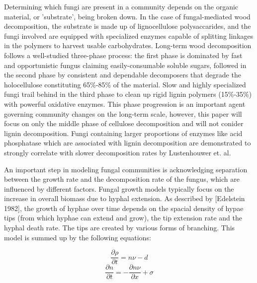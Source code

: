 \documentclass[12pt]{article}
\begin{document}
\begin{multicols}{2}
Determining which fungi are present in a community depends on the organic material, or 'substrate', being broken down. In the case of fungal-mediated wood decomposition, the substrate is made up of lignocellulose polysaccarides, and the fungi involved are equipped with specialized enzymes capable of splitting linkages in the polymers to harvest usable carbohydrates. Long-term wood decomposition follows a well-studied three-phase process: the first phase is dominated by fast and opportunistic fungus claiming easily-consumable soluble sugars, followed in the second phase by consistent and dependable decomposers that degrade the holocellulose constituting 65\%-85\% of the material. \cite{Aspergilli} Slow and highly specialized fungi trail behind in the third phase to clean up rigid lignin polymers (15\%-35\%) with powerful oxidative enzymes. \cite{Moorhead2006} This phase progression is an important agent governing community changes on the long-term scale, however, this paper will focus on only the middle phase of cellulose decomposition and will not conider lignin decomposition. Fungi containing larger proportions of enzymes like acid phosphatase which are associated with lignin decomposition are demonstrated to strongly correlate with slower decomposition rates by Lustenhouwer et. al.

An important step in modeling fungal communities is acknowledging separation between the growth rate and the decomposition rate of the fungus, which are influenced by different factors. Fungal growth models typically focus on the increase in overall biomass due to hyphal extension. As described by [Edelstein 1982], the growth of hyphae over time depends on the spacial density of hypae tips (from which hyphae can extend and grow), the tip extension rate and the hyphal death rate. The tips are created by various forms of branching. This model is summed up by the following equations:

\begin{equation} \label {eq}
\frac{\partial \rho}{\partial t} = n\nu - d
\end{equation}
\begin{equation} \label {eq}
\frac{\partial n}{\partial t} = -\frac{\partial n\nu}{\partial x} + \sigma
\end{equation}


\end{multicols}
\end{document}
